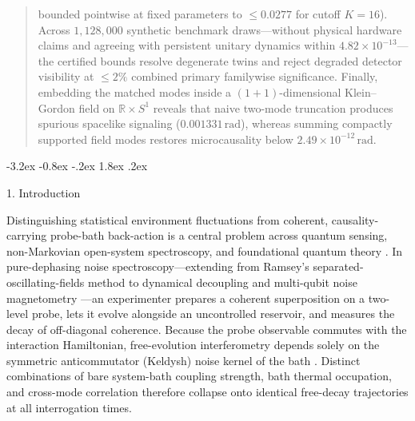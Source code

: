 \documentclass[11pt,letterpaper]{article}
\makeatletter
\renewcommand\section{\@startsection{section}{1}{\z@}%
  {-3.2ex \@plus -0.8ex \@minus -.2ex}%
  {1.8ex \@plus .2ex}%
  {\normalfont\Large\bfseries\raggedright\hyphenpenalty=10000}}
\theoremstyle{definition}
\makeatother
\begin{document}
\begin{abstract}
bounded pointwise at fixed parameters to \(\le 0.0277\) for cutoff
\(K=16\)). Across \(1{,}128{,}000\) synthetic benchmark draws---without
physical hardware claims and agreeing with persistent unitary dynamics
within \(4.82 \times 10^{-13}\)---the certified bounds resolve
degenerate twins and reject degraded detector visibility at \(\le 2\%\)
combined primary familywise significance. Finally, embedding the matched
modes inside a \((1+1)\)-dimensional Klein--Gordon field on
\(\mathbb{R} \times S^1\) reveals that naive two-mode truncation
produces spurious spacelike signaling (\(0.001331\,\mathrm{rad}\)),
whereas summing compactly supported field modes restores microcausality
below \(2.49 \times 10^{-12}\,\mathrm{rad}\).
\end{abstract}
\vspace{6pt}
\vspace{10pt}

\section{1. Introduction}\label{introduction}

Distinguishing statistical environment fluctuations from coherent,
causality-carrying probe-bath back-action is a central problem across
quantum sensing, non-Markovian open-system spectroscopy, and
foundational quantum theory
\citep{breuerPetruccione2002, weiss2012, rivas2014, breuer2016, degen2017}.
In pure-dephasing noise spectroscopy---extending from Ramsey's
separated-oscillating-fields method \citep{ramsey1950} to dynamical
decoupling and multi-qubit noise magnetometry
\citep{alvarezSuter2011, bylander2011, pazSilvaViola2014, szankowski2016, szankowski2017, pazSilva2017, pazSilva2019, smirne2016, chalermpusitarak2021}---an
experimenter prepares a coherent superposition on a two-level probe,
lets it evolve alongside an uncontrolled reservoir, and measures the
decay of off-diagonal coherence. Because the probe observable commutes
with the interaction Hamiltonian, free-evolution interferometry depends
solely on the symmetric anticommutator (Keldysh) noise kernel of the
bath
\citep{feynmanVernon1963, caldeiraLeggett1983, leggett1987, huPazZhang1992, luczka1990, palma1996, reina2002, zurek2003, clerk2010}.
Distinct combinations of bare system-bath coupling strength, bath
thermal occupation, and cross-mode correlation therefore collapse onto
identical free-decay trajectories at all interrogation times.
\end{document}
